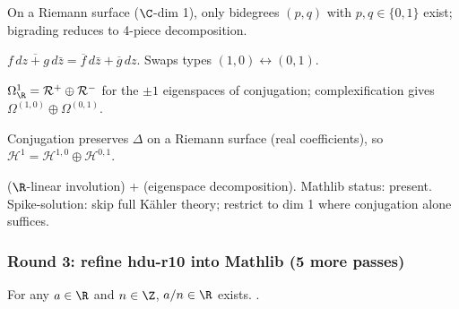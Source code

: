 \begin{lemma}
\label{lem:hbs-r11}
On a Riemann surface ($\C$-dim 1), only bidegrees $(p,q)$ with $p,q \in \{0,1\}$ exist; bigrading reduces to 4-piece decomposition.
\leanok\mathlibok
\end{lemma}

\begin{lemma}
\label{lem:hbs-r12}
$\overline{f\,dz + g\,d\bar z} = \overline f\,d\bar z + \overline g\,dz$.  Swaps types $(1,0) \leftrightarrow (0,1)$.
\leanok\mathlibok
\end{lemma}

\begin{lemma}
\label{lem:hbs-r13}
$\Omega^{1}_{\R} = \mathcal{R}^{+}\oplus\mathcal{R}^{-}$ for the $\pm 1$ eigenspaces of conjugation; complexification gives $\Omega^{(1,0)}\oplus\Omega^{(0,1)}$.
\leanok\mathlibok
\end{lemma}

\begin{lemma}
\label{lem:hbs-r14}
Conjugation preserves $\Delta$ on a Riemann surface (real coefficients), so $\mathcal{H}^{1} = \mathcal{H}^{1,0}\oplus\mathcal{H}^{0,1}$.
\leanok
\end{lemma}

\begin{lemma}
\label{lem:hbs-r15}
 ($\R$-linear involution) +  (eigenspace decomposition).  Mathlib status: present.  Spike-solution: skip full K\"ahler theory; restrict to dim 1 where conjugation alone suffices.
\leanok\mathlibok
\end{lemma}

\subsubsection*{Round 3: refine hdu-r10 into Mathlib (5 more passes)}

\begin{lemma}
\label{lem:hdu-r11}
For any $a\in\R$ and $n\in\Z$, $a/n\in\R$ exists.  .
\leanok\mathlibok
\end{lemma}

